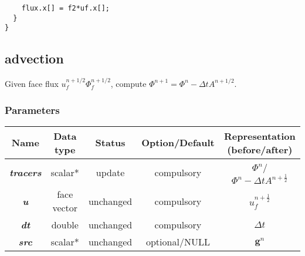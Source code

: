 \documentclass[a4paper]{article}
\newcommand{\func}[1]{\textbf{\textcolor{function}{#1}}}
\newcommand{\para}[1]{\textbf{\emph{\textcolor{para}{#1}}}}
\begin{document}
\begin{multicols}{2}
  \columnbreak
  \begin{verbatim}
    flux.x[] = f2*uf.x[];
  }
}
  \end{verbatim}
\end{multicols}

\subsection{\func{advection}}
Given face flux $u^{n+1/2}_f\Phi^{n+1/2}_f$, compute $\Phi^{n+1} = \Phi^n-\Delta t A^{n+1/2}$.
\subsubsection{Parameters}
\begin{center}
  \begin{tabular}{|c|c|c|c|c|}
    \hline
    Name & Data type & Status & Option/Default & Representation (before/after)\\[0.5ex]
    \hline\hline
    \rowcolor{output} \para{tracers} & scalar* & update & compulsory & $\Phi^n$/ $\Phi^n-\Delta t A^{n+ \frac{1}{2}}$\\
    \hline
    \para{u} & face vector & unchanged & compulsory & $u_f^{n + \frac{1}{2}}$\\
    \hline
    \para{dt} & double & unchanged & compulsory & $\Delta t$\\
    \hline
    \para{src} & scalar* & unchanged & optional/NULL & $ \mathbf{g}^n$ \\
    \hline
  \end{tabular}
\end{center}
\end{document}
